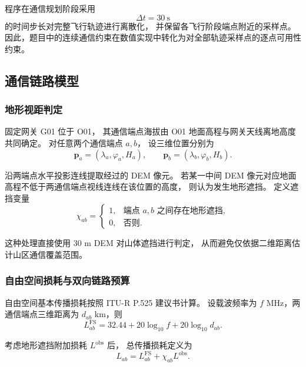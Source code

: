 程序在通信规划阶段采用
\begin{equation}
\Delta t=30\ \mathrm{s}
\label{eq:q3-sample-step}
\end{equation}
的时间步长对完整飞行轨迹进行离散化，
并保留各飞行阶段端点附近的采样点。
因此，题目中的连续通信约束在数值实现中转化为对全部轨迹采样点的逐点可用性约束。

\subsection{通信链路模型}

\subsubsection{地形视距判定}

固定网关 G01 位于 O01，
其通信端点海拔由 O01 地面高程与网关天线离地高度共同确定。
对任意两个通信端点 $a,b$，
设三维位置分别为
\[
\mathbf{p}_a=(\lambda_a,\varphi_a,H_a),\qquad
\mathbf{p}_b=(\lambda_b,\varphi_b,H_b).
\]

沿两端点水平投影连线提取经过的 DEM 像元。
若某一中间 DEM 像元对应地面高程不低于两通信端点视线连线在该位置的高度，
则认为发生地形遮挡。
定义遮挡变量
\begin{equation}
\chi_{ab}=
\begin{cases}
1,&\text{端点 }a,b\text{ 之间存在地形遮挡},\\
0,&\text{否则}.
\end{cases}
\label{eq:q3-block}
\end{equation}

这种处理直接使用 30 m DEM 对山体遮挡进行判定，
从而避免仅依据二维距离估计山区通信覆盖范围。

\subsubsection{自由空间损耗与双向链路预算}

自由空间基本传播损耗按照 ITU-R P.525 建议书计算\cite{q3-itu525}。
设载波频率为 $f$ MHz，两通信端点三维距离为 $d_{ab}$ km，则
\begin{equation}
L_{ab}^{\mathrm{FS}}
=32.44+20\log_{10}f+20\log_{10}d_{ab}.
\label{eq:q3-fspl}
\end{equation}

考虑地形遮挡附加损耗 $L^{\mathrm{obs}}$ 后，
总传播损耗定义为
\begin{equation}
L_{ab}
=L_{ab}^{\mathrm{FS}}
+\chi_{ab}L^{\mathrm{obs}}.
\label{eq:q3-total-loss}
\end{equation}


